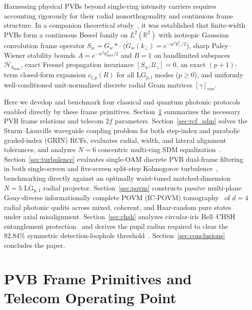 \documentclass{optica-article}
\begin{document}
Harnessing physical PVBs beyond single-ring intensity carriers requires accounting rigorously for their radial nonorthogonality and continuous frame structure. In a companion theoretical study~\cite{AyalaV15Paper1}, it was established that finite-width PVBs form a continuous Bessel family on $L^2(\mathbb{R}^2)$ with isotropic Gaussian convolution frame operator $S_w = G_w * \cdot$ ($\widetilde{G}_w(k_\perp) = e^{-w^2 k_\perp^2/2}$), sharp Paley--Wiener stability bounds $A = e^{-w^2 k_{\max}^2/2}$ and $B = 1$ on bandlimited subspaces $\mathcal{H}_{k_{\max}}$, exact Fresnel propagation invariance $[S_w, \mathcal{U}_z] = 0$, an exact $(p+1)$-term closed-form expansion $c_{l,p}(R)$ for all $\mathrm{LG}_{p,l}$ modes ($p \ge 0$), and uniformly well-conditioned unit-normalized discrete radial Gram matrices $[\gamma]_{nm}$.

Here we develop and benchmark four classical and quantum photonic protocols enabled directly by these frame primitives. Section~\ref{sec:primitives} summarizes the necessary PVB frame relations and telecom $2f$ parameters. Section~\ref{sec:rcf_sdm} solves the Sturm--Liouville waveguide coupling problem for both step-index and parabolic graded-index (GRIN) RCFs, evaluates radial, width, and lateral alignment tolerances, and analyzes $N = 6$ concentric multi-ring SDM equalization~\cite{Fontaine2019,Fu2018,Berkhout2010,Proakis2008}. Section~\ref{sec:turbulence} evaluates single-OAM discrete PVB dual-frame filtering in both single-screen and five-screen split-step Kolmogorov turbulence~\cite{Lane1992,AndrewsPhillips2005}, benchmarking directly against an optimally waist-tuned matched-dimension $N = 5$ $\mathrm{LG}_{p,1}$ radial projector. Section~\ref{sec:povm} constructs passive multi-plane Gouy-diverse informationally complete POVM (IC-POVM) tomography~\cite{Gu2018,Zhou2017,Zhou2019,Choudhary2018,Renes2004,Lvovsky2004} of $d = 4$ radial photonic qudits across mixed, coherent, and Haar-random pure states under axial misalignment. Section~\ref{sec:chsh} analyzes circular-iris Bell--CHSH entanglement protection~\cite{Clauser1969,LawEberly2004,Walborn2010} and derives the pupil radius required to clear the $82.84\%$ symmetric detection-loophole threshold~\cite{Eberhard1993,Vertesi2010}. Section~\ref{sec:conclusions} concludes the paper.

\section{PVB Frame Primitives and Telecom Operating Point}
\label{sec:primitives}
\end{document}
